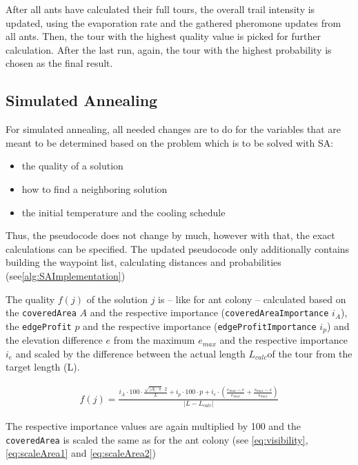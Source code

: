 After all ants have calculated their full tours, the overall trail intensity is updated, using the evaporation rate and the gathered pheromone updates from all ants. 
Then, the tour with the highest quality value is picked for further calculation. 
After the last run, again, the tour with the highest probability is chosen as the final result.



\subsection{Simulated Annealing}
\label{subsec:simulatedAnnealingImplementation}

For simulated annealing, all needed changes are to do for the variables that are meant to be determined based on the problem which is to be solved with SA:
\begin{itemize}
	\item the quality of a solution
	\item how to find a neighboring solution
	\item the initial temperature and the cooling schedule
\end{itemize} 

Thus, the pseudocode does not change by much, however with that, the exact calculations can be specified. 
The updated pseudocode only additionally contains building the waypoint list, calculating distances and probabilities (see\ref{alg:SAImplementation})

The quality $f(j)$ of the solution $j$ is -- like for ant colony -- calculated based on the \texttt{coveredArea} $A$ and the respective importance (\texttt{coveredAreaImportance} $i_A$), the \texttt{edgeProfit} $p$ and the respective importance (\texttt{edgeProfitImportance} $i_p$) and the elevation difference $e$ from the maximum $e_{max}$ and the respective importance $i_e$ and scaled by the difference between the actual length $L_{calc}$of the tour from the target length (L). 

\begin{equation}
	\label{eq:qualitySA}
	\begin{split}
		f(j) = \frac{i_A \cdot 100 \cdot \frac{\sqrt{|A|\cdot \pi} \cdot 2 }{L} 
		+  i_p \cdot 100 \cdot p
		+ i_e \cdot \left(\frac{e_{max} - e}{e_{max}} + \frac{s_{max} - s}{s_{max}}\right)}{\left| L - L_{calc} \right|}
	\end{split}
\end{equation}

The respective importance values are again multiplied by 100 and the  \texttt{coveredArea} is scaled the same as for the ant colony (see \ref{eq:visibility}, \ref{eq:scaleArea1} and \ref{eq:scaleArea2})

